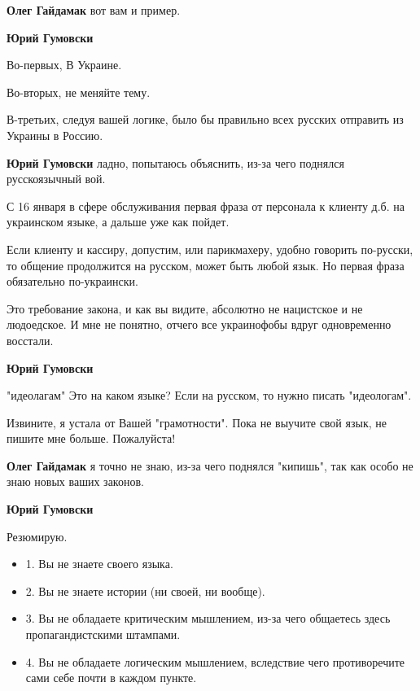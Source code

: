 \begin{itemize}
\begin{itemize}
\textbf{Олег Гайдамак} вот вам и пример.


\textbf{Юрий Гумовски} 

Во-первых, В Украине. 

Во-вторых, не меняйте тему.

В-третьих, следуя вашей логике, было бы правильно всех русских отправить из
Украины в Россию.


\textbf{Юрий Гумовски} ладно, попытаюсь объяснить, из-за чего поднялся русскоязычный вой.

С 16 января в сфере обслуживания первая фраза от персонала к клиенту д.б. на
украинском языке, а дальше уже как пойдет.

Если клиенту и кассиру, допустим, или парикмахеру, удобно говорить по-русски,
то общение продолжится на русском, может быть любой язык. Но первая фраза
обязательно по-украински.

Это требование закона, и как вы видите, абсолютно не нацистское и не
людоедское. И мне не понятно, отчего все украинофобы вдруг одновременно
восстали.



\textbf{Юрий Гумовски} 

"идеолагам" Это на каком языке? Если на русском, то нужно писать "идеологам". 

Извините, я устала от Вашей "грамотности". Пока не выучите свой язык, не пишите
мне больше. Пожалуйста!


\textbf{Олег Гайдамак} я точно не знаю, из-за чего поднялся "кипишь", так как особо не знаю новых ваших законов.


\textbf{Юрий Гумовски} 

Резюмирую.

\begin{itemize}
  \item 1. Вы не знаете своего языка.
  \item 2. Вы не знаете истории (ни своей, ни вообще).
  \item 3. Вы не обладаете критическим мышлением, из-за чего общаетесь здесь пропагандистскими штампами.
  \item 4. Вы не обладаете логическим мышлением, вследствие чего противоречите сами себе почти в каждом пункте.
\end{itemize}


\end{itemize}
\end{itemize}
